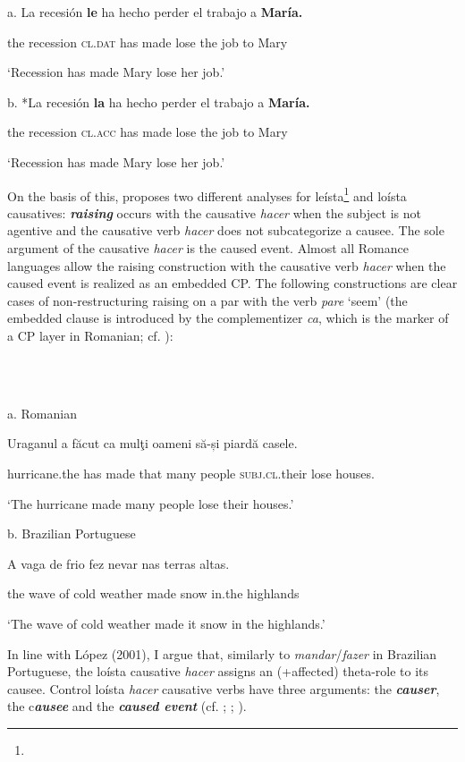 \documentclass[output=paper]{langsci/langscibook}
\begin{document}
          a.  La  recesión  \textbf{le}          ha  hecho perder el   trabajo  a  \textbf{María.}   

the recession \textsc{cl.dat} has made lose     the  job       to Mary

‘Recession has made Mary lose her job.’

b.  *La recesión  \textbf{la}          ha  hecho perder el  trabajo  a  \textbf{María.}   

the  recession \textsc{cl.acc} has made  lose    the job       to Mary

‘Recession has made Mary lose her job.’

On the basis of this, \citet{Torrego2010} proposes two different analyses for leísta\footnote{} and loísta causatives: \textbf{\textit{raising}} occurs with the causative \textit{hacer} when the subject is not agentive and the causative verb \textit{hacer} does not subcategorize a causee. The sole argument of the causative \textit{hacer} is the caused event. Almost all Romance languages allow the raising construction with the causative verb \textit{hacer} when the caused event is realized as an embedded CP. The following constructions are clear cases of non-restructuring raising on a par with the verb \textit{pare} ‘seem’ (the embedded clause is introduced by the complementizer \textit{ca}, which is the marker of a CP layer in Romanian; cf. \citealt{Alboiu2007}):

\ea%
    \label{ex:moreno:8}
    \gll\\
        \\
    \glt
    \z

          a.  Romanian

Uraganul    a    făcut   ca   mulţi  oameni  să-și              piardă casele.   

    hurricane.the has made  that many people   \textsc{subj.cl}.their lose     houses. 

    ‘The hurricane made many people lose their houses.’

  b.  Brazilian Portuguese

A   vaga  de frio     fez   nevar   nas     terras altas.  

    the wave of cold weather   made  snow  in.the highlands

    ‘The wave of cold weather made it snow in the highlands.’    

In line with López (2001), I argue that, similarly to \textit{mandar}/\textit{fazer} in Brazilian Portuguese, the loísta causative \textit{hacer} assigns an (+affected) theta-role to its causee. Control loísta \textit{hacer} causative verbs have three arguments: the \textbf{\textit{causer}}, the c\textbf{\textit{ausee} }and the \textbf{\textit{caused event}} (cf. \citealt{Zubizarreta1985}; \citealt{Alsina1992}; \citealt{Ippolito2000}). 
\end{document}
